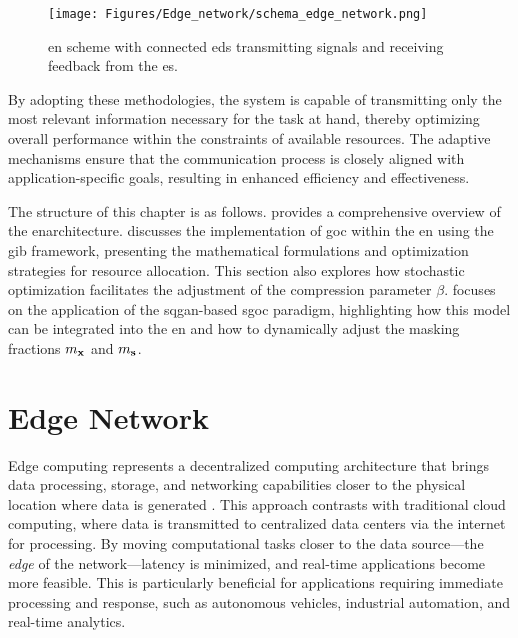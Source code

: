 \begin{figure}[!t] 
    \centering 
    \texttt{[image: Figures/Edge\_network/schema\_edge\_network.png]} 
    \caption[Edge Network Scheme]{\acrshort{en} scheme with connected \acrshort{ed}s transmitting signals and receiving feedback from the \acrshort{es}.}
    \label{fig: EN en_scheme} 
\end{figure} 

By adopting these methodologies, the system is capable of transmitting only the most relevant information necessary for the task at hand, thereby optimizing overall performance within the constraints of available resources. The adaptive mechanisms ensure that the communication process is closely aligned with application-specific goals, resulting in enhanced efficiency and effectiveness.


The structure of this chapter is as follows.  provides a comprehensive overview of the \gls{en}architecture.  discusses the implementation of \gls{goc} within the \gls{en} using the \gls{gib} framework, presenting the mathematical formulations and optimization strategies for resource allocation. This section also explores how stochastic optimization facilitates the adjustment of the compression parameter $\beta$.  focuses on the application of the \gls{sqgan}-based \gls{sgoc} paradigm, highlighting how this model can be integrated into the \gls{en} and how to dynamically adjust the masking fractions $m_{\mathbf{x}}$ and $m_{\mathbf{s}}$.

\section{Edge Network}\label{sec: EN_en desciption}
Edge computing represents a decentralized computing architecture that brings data processing, storage, and networking capabilities closer to the physical location where data is generated \cite{Shi2016edge,Satyanarayanan2017edge,Liu2019edge}. This approach contrasts with traditional cloud computing, where data is transmitted to centralized data centers via the internet for processing. By moving computational tasks closer to the data source—the \textit{edge} of the network—latency is minimized, and real-time applications become more feasible. This is particularly beneficial for applications requiring immediate processing and response, such as autonomous vehicles, industrial automation, and real-time analytics.

